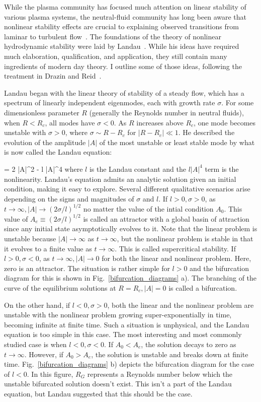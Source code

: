 While the plasma community has focused much attention on linear stability of various plasma systems, the neutral-fluid 
community has long been aware that nonlinear stability effects are crucial to explaining observed transitions from laminar to turbulent flow~\cite{krommes1999}.
The foundations of the theory of nonlinear hydrodynamic stability were laid by Landau~\cite{landau1944,landau1959}. While his ideas have required much elaboration, qualification, and application,
they still contain many ingredients of modern day theory. I outline some of those ideas, following the treatment in Drazin and Reid~\cite{drazin1981}.

Landau began with the linear theory of stability of a steady flow, which has a spectrum of linearly independent eigenmodes, each with growth rate $\sigma$. For some dimensionless parameter $R$ 
(generally the Reynolds number in neutral fluids), when $R < R_c$, all modes have $\sigma < 0$. As $R$ increases above $R_c$, one mode becomes unstable with $\sigma > 0$, where 
$\sigma \sim R - R_c$ for $|R-R_c| \ll 1$.
He described the evolution of the amplitude $|A|$ of the most unstable or least stable mode by what is now called the Landau equation:

\beq
\label{landau_eqn}
 = 2 \sigma |A|^2 - l |A|^4
\eeq
where $l$ is the Landau constant and the $l |A|^4$ term is the nonlinearity. Landau's equation admits an analytic solution given an initial condition, making it easy to explore. 
Several different qualitative scenarios arise depending on the signs and magnitudes of $\sigma$ and $l$. If $l>0, \sigma>0$, as $t \rightarrow \infty, |A| \rightarrow (2 \sigma/l)^{1/2}$ no matter
the value of the intial condition $A_0$. This value of $A_e \equiv (2 \sigma/l)^{1/2}$ is called an attractor with a global basin of attraction since any initial state asymptotically evolves to it. 
Note that the linear problem
is unstable because $|A| \rightarrow \infty$ as $t \rightarrow \infty$, but the nonlinear problem is stable in that it evolves to a finite value as $t \rightarrow \infty$. This is called
supercritical stability. If $l>0, \sigma<0$, as $t \rightarrow \infty, |A| \rightarrow 0$ for both the linear and nonlinear problem. Here, zero is an attractor. The situation is rather simple for
$l>0$ and the bifurcation diagram for this is shown in Fig.~\ref{bifurcation_diagrams} a). The branching of the curve of the equilibrium solutions at $R = R_c, |A| = 0$ is called a bifurcation.

On the other hand, if $l<0, \sigma>0$, both the linear and the nonlinear problem are unstable with the nonlinear problem growing super-exponentially in time, becoming infinite at finite time.
Such a situation is unphysical, and the Landau equation is too simple in this case. The most interesting and most commonly studied case is when $l<0, \sigma<0$. If $A_0 < A_e$, the solution
decays to zero as $t \rightarrow \infty$. However, if $A_0 > A_e$, the solution is unstable and breaks down at finite time. Fig.~\ref{bifurcation_diagrams} b) depicts the bifurcation diagram
for the case of $l<0$. In this figure, $R_G$ represents a Reynolds number below which the unstable bifurcated solution doesn't exist. This isn't a part of the Landau equation, but Landau
suggested that this should be the case. 


